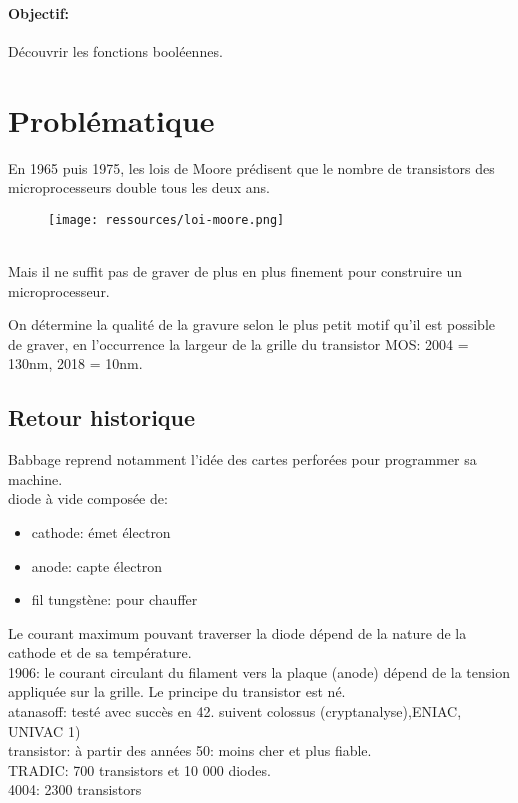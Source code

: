 \documentclass[a4paper,11pt]{article}
\begin{document}
\begin{Form}
\paragraph{Objectif:}Découvrir les fonctions booléennes.
\section{Problématique}
En 1965 puis 1975, les lois de Moore prédisent que le nombre de transistors des microprocesseurs double tous les deux ans.
\begin{figure}[!h]
\centering
\texttt{[image: ressources/loi-moore.png]}
\label{moore}
\end{figure}
\\Mais il ne suffit pas de graver de plus en plus finement pour construire un microprocesseur.
\begin{commentprof}
On détermine la qualité de la gravure selon le plus petit motif qu'il est possible de graver, en l'occurrence la largeur de la grille du transistor MOS: 2004 = 130nm, 2018 = 10nm.
\end{commentprof}
\begin{center}
\end{center}
\begin{commentprof}
\section*{Retour historique}
Babbage reprend notamment l'idée des cartes perforées pour programmer sa machine.\\diode à vide composée de:
\begin{itemize}
\item cathode: émet électron
\item anode: capte électron
\item fil tungstène: pour chauffer
\end{itemize}
Le courant maximum pouvant traverser la diode dépend de la nature de la cathode et de sa température.\\1906: le courant circulant du filament vers la plaque (anode) dépend de la tension appliquée sur la grille. Le principe du transistor est né.\\atanasoff: testé avec succès en 42. suivent colossus (cryptanalyse),ENIAC, UNIVAC 1)\\transistor: à partir des années 50: moins cher et plus fiable.\\TRADIC: 700 transistors et 10 000 diodes.\\4004: 2300 transistors 
\end{commentprof}

\end{Form}
\end{document}
